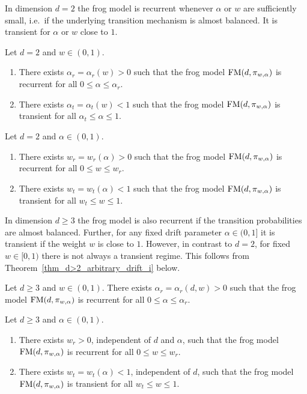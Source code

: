 In dimension $d=2$ the frog model is recurrent whenever $\alpha$ or $w$ are sufficiently small, i.e.~if the underlying transition mechanism is almost balanced. It is transient for $\alpha$ or $w$ close to $1$.

\begin{thm}\label{thm_d=2_arbitrary_weight}
 Let $d =2$ and $w \in (0,1)$. 
 \begin{enumerate}
  \item\label{thm_d=2_arbitrary_weight_i} There exists $\alpha_r = \alpha_r(w) > 0$ such that the frog model $\operatorname{FM}(d,\pi_{w,\alpha})$ is recurrent for all $0 \leq \alpha \leq \alpha_r$.
  \item\label{thm_d=2_arbitrary_weight_ii} There exists $\alpha_t = \alpha_t(w) < 1$ such that the frog model $\operatorname{FM}(d,\pi_{w,\alpha})$ is transient for all $\alpha_t \leq \alpha \leq 1$.
 \end{enumerate}
\end{thm}

\begin{thm}\label{thm_d=2_arbitrary_drift}
 Let $d=2$ and $\alpha \in (0,1)$.
 \begin{enumerate}
  \item\label{thm_d=2_arbitrary_drift_i} There exists $w_r = w_r(\alpha) > 0$ such that the frog model $\operatorname{FM}(d,\pi_{w,\alpha})$ is recurrent for all $0 \leq w \leq w_r$.
  \item\label{thm_d=2_arbitrary_drift_ii} There exists $w_t = w_t(\alpha) < 1$ such that the frog model $\operatorname{FM}(d,\pi_{w,\alpha})$ is transient for all $w_t \leq w \leq 1$.
 \end{enumerate}
\end{thm}

In dimension $d \geq 3$ the frog model is also recurrent if the transition probabilities are almost balanced. Further, for any fixed drift parameter $\alpha \in (0,1]$ it is transient if the weight $w$ is close to $1$. However, in contrast to $d=2$, for fixed $w \in [0,1)$ there is not always a transient regime. This follows from Theorem~\ref{thm_d>2_arbitrary_drift_i} below.

\begin{thm}\label{thm_d>2_arbitrary_weight}
 Let $d \geq 3$ and $w \in (0,1)$. 
 There exists $\alpha_r = \alpha_r(d,w) > 0$ such that the frog model $\operatorname{FM}(d,\pi_{w,\alpha})$ is recurrent for all $0 \leq \alpha \leq \alpha_r$.
\end{thm}


\begin{thm}\label{thm_d>2_arbitrary_drift}
 Let $d\geq 3$ and $\alpha \in (0,1)$.
 \begin{enumerate}
  \item\label{thm_d>2_arbitrary_drift_i} There exists $w_r > 0$, independent of $d$ and $\alpha$, such that the frog model $\operatorname{FM}(d,\pi_{w,\alpha})$ is recurrent for all $0 \leq w \leq w_r$.
  \item\label{thm_d>2_arbitrary_drift_ii} There exists $w_t = w_t(\alpha) < 1$, independent of $d$, such that the frog model $\operatorname{FM}(d,\pi_{w,\alpha})$ is transient for all $w_t \leq w \leq 1$.
 \end{enumerate}
\end{thm}

